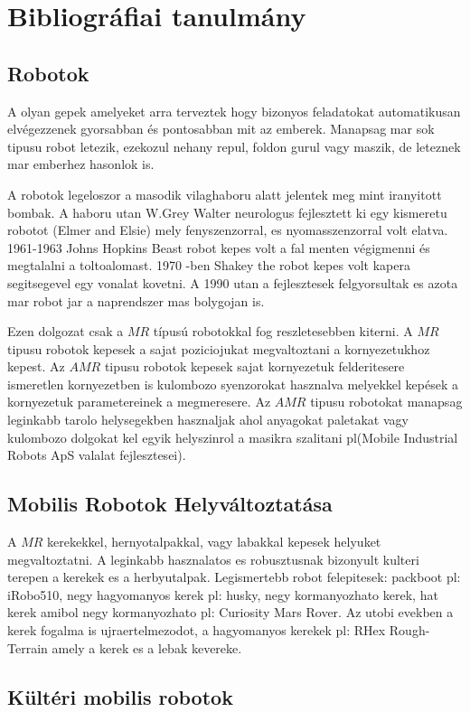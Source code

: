 \FloatBarrier

\chapter{Bibliográfiai tanulmány}

\section{Robotok}
A olyan gepek amelyeket arra terveztek hogy bizonyos feladatokat automatikusan elvégezzenek gyorsabban és pontosabban mit az emberek. Manapsag mar sok tipusu robot letezik, ezekozul nehany repul, foldon gurul vagy maszik, de leteznek mar emberhez hasonlok is.

A robotok legeloszor a masodik vilaghaboru alatt jelentek meg mint iranyitott bombak. A haboru utan W.Grey Walter neurologus fejlesztett ki egy kismeretu robotot (Elmer and Elsie) mely fenyszenzorral, es nyomasszenzorral volt elatva. 1961-1963 Johns Hopkins Beast robot kepes volt a fal menten végigmenni és megtalalni a toltoalomast. 1970 -ben Shakey the robot kepes volt kapera segitsegevel egy vonalat kovetni. A 1990 utan a fejlesztesek felgyorsultak es azota mar robot jar a naprendszer mas bolygojan is.

Ezen dolgozat csak a $MR$ típusú robotokkal fog reszletesebben kiterni. A $MR$ tipusu robotok kepesek a sajat poziciojukat megvaltoztani a kornyezetukhoz kepest. Az $AMR$ tipusu robotok kepesek sajat kornyezetuk felderitesere ismeretlen kornyezetben is kulombozo syenzorokat hasznalva melyekkel kepések a kornyezetuk parametereinek a megmeresere. Az $AMR$ tipusu robotokat manapsag leginkabb tarolo helysegekben hasznaljak ahol anyagokat paletakat vagy kulombozo dolgokat kel egyik helyszinrol a masikra szalitani pl(Mobile Industrial Robots ApS valalat fejlesztesei).

\section{Mobilis Robotok Helyváltoztatása}
A $MR$ kerekekkel, hernyotalpakkal, vagy labakkal kepesek helyuket megvaltoztatni. A leginkabb hasznalatos es robusztusnak bizonyult kulteri terepen a kerekek es a herbyutalpak.
Legismertebb robot felepitesek: packboot pl: iRobo510,
negy hagyomanyos kerek pl: husky, negy kormanyozhato kerek, hat kerek amibol negy kormanyozhato pl: Curiosity Mars Rover.
Az utobi evekben a kerek fogalma is ujraertelmezodot, a hagyomanyos kerekek pl: RHex Rough-Terrain amely a kerek es a lebak kevereke.


\section{Kültéri mobilis robotok}






 \newpage




